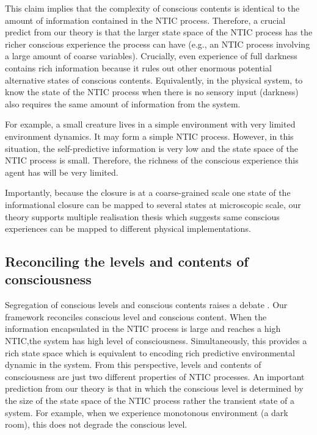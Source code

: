 \documentclass[utf8]{article}
\begin{document}
        This claim implies that the complexity of conscious contents is identical to the amount of information contained in the NTIC process. Therefore, a crucial predict from our theory is that the larger state space of the NTIC process has the richer conscious experience the process can have (e.g., an NTIC process involving a large amount of coarse variables). Crucially, even experience of full darkness contains rich information because it rules out other enormous potential alternative states of conscious contents. Equivalently, in the physical system, to know the state of the NTIC process when there is no sensory input (darkness) also requires the same amount of information from the system. 
        
        For example, a small creature lives in a simple environment with very limited environment dynamics. It may form a simple NTIC process. However, in this situation, the self-predictive information is very low and the state space of the NTIC process is small. Therefore, the richness of the conscious experience this agent has will be very limited. 
        
        Importantly, because the closure is at a coarse-grained scale one state of the informational closure can be mapped to several states at microscopic scale, our theory supports multiple realisation thesis  which suggests same conscious experiences can be mapped to different physical implementations. 
        
        
	    \subsection{Reconciling the levels and contents of consciousness}
	    Segregation of conscious levels and conscious contents raises a debate \citep{bayne2016there, Fazekas2016}. Our framework reconciles conscious level and conscious content. When the information encapsulated in the NTIC process is large and reaches a high NTIC,the system has high level of consciousness. Simultaneously, this provides a rich state space which is equivalent to encoding rich predictive environmental dynamic in the system. From this perspective, levels and contents of consciousness are just two different properties of NTIC processes. An important prediction from our theory is that in which the conscious level is determined by the size of the state space of the NTIC process rather the transient state of a system. For example, when we experience monotonous environment (a dark room), this does not degrade the conscious level.
	    
\end{document}
